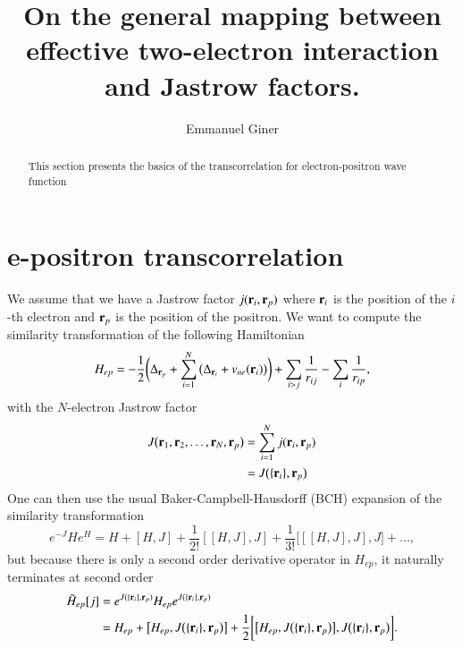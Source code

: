 \documentclass[aip,jcp,reprint,noshowkeys,superscriptaddress]{revtex4-1}
\newcommand{\bri}[1]{{\bf r}_{#1}}
\newcommand{\Hep}[0]{H_{ep}}
\newcommand{\Hept}[0]{\tilde{H}_{ep}}
\begin{document}
	

\title{On the general mapping between effective two-electron interaction and Jastrow factors.}

\author{Emmanuel Giner}

\begin{abstract}
This section presents the basics of the transcorrelation for electron-positron wave function
\end{abstract}

\maketitle
\section{e-positron transcorrelation}
We assume that we have a Jastrow factor $j(\bri{i},\bri{p})$ where $\bri{i}$ is the position of the $i$-th electron and $\bri{p}$ is the position of the positron. 
We want to compute the similarity transformation of the following Hamiltonian
\begin{equation}
 \Hep = -\frac{1}{2} \bigg( \Delta_{\bri{p}} + \sum_{i=1}^{N} \big(\Delta_{\bri{i}} + v_{ne}(\bri{i})\big) \bigg) + \sum_{i>j}\frac{1}{r_{ij}} - \sum_{i} \frac{1}{r_{ip}},
\end{equation}
with the $N$-electron Jastrow factor 
\begin{equation}
 \begin{aligned}
 J\big( \bri{1}, \bri{2}, \hdots, \bri{N}, \bri{p}\big) & = \sum_{i=1}^N j(\bri{i},\bri{p}) \\
                                                        & = J\big(\{\bri{i} \},\bri{p}\big)
 \end{aligned}
\end{equation}
One can then use the usual Baker-Campbell-Hausdorff (BCH) expansion of the similarity transformation 
\begin{equation}
 e^{-J}He^{H} = H + [H,J] + \frac{1}{2!} [[H,J],J] + \frac{1}{3!} \big[[[H,J],J],J\big] + \hdots, 
\end{equation}
but because there is only a second order derivative operator in $\Hep$, it naturally terminates at second order 
\begin{equation}
 \begin{aligned}
 \Hept[j] &= e^{J(\{\bri{i} \},\bri{p})} \Hep e^{J(\{\bri{i} \},\bri{p})} \\
          &= \Hep + \big[\Hep,J\big(\{\bri{i} \},\bri{p}\big)\big] + \frac{1}{2} \bigg[\big[\Hep,J\big(\{\bri{i} \},\bri{p}\big)\big], J\big(\{\bri{i} \},\bri{p}\big) \bigg].
 \end{aligned}
\end{equation}
\end{document}
